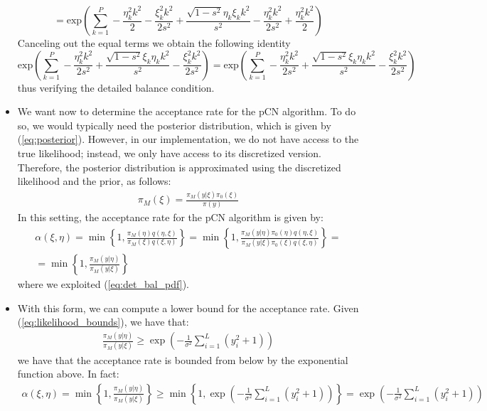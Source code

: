 \documentclass{article}
\begin{document}
\begin{itemize}
{$$    $$
    $$
    = \text{exp} \left( \sum_{k=1}^P - \frac{\eta_k^{2} k^2} {2} - \frac{ \xi^{2}_k k^2 } {2s^2} + \frac{\sqrt{1-s^2}\eta_k\xi_k k^2}{s^2} - \frac{ \eta^{2}_k k^2 } {2s^2} + \frac{ \eta^{2}_k k^2 } {2}\right)
    $$
    Canceling out the equal terms we obtain the following identity
    $$
    \text{exp} \left( \sum_{k=1}^P - \frac{ \eta^{2}_k k^2 } {2s^2} + \frac{\sqrt{1-s^2}\xi_k\eta_k k^2}{s^2} - \frac{ \xi^2_k k^2 } {2s^2} \right) =  \text{exp} \left( \sum_{k=1}^P - \frac{ \eta^{2}_k k^2 } {2s^2} + \frac{\sqrt{1-s^2}\xi_k\eta_k k^2}{s^2} - \frac{ \xi^2_k k^2 } {2s^2} \right) 
    $$
    thus verifying the detailed balance condition.}\\
\item{
    We want now to determine the acceptance rate for the pCN algorithm. To do so, we would typically 
    need the posterior distribution, which is given by (\ref{eq:posterior}). However, in our implementation, we do not have access to the true likelihood; 
    instead, we only have access to its discretized version. Therefore, the posterior distribution is 
    approximated using the discretized likelihood and the prior, as follows:
    \begin{gather*}
        \pi_M(\xi) = \frac{\pi_M(y|\xi)\pi_0(\xi)}{\pi(y)} 
    \end{gather*}
    In this setting, the acceptance rate for the pCN algorithm is given by:
    \begin{gather*}
        \alpha(\xi,\eta) = \min\left\{1, \frac{\pi_M(\eta)q(\eta,\xi)}{\pi_M(\xi)q(\xi,\eta)} \right\} =
        \min\left\{1, \frac{\pi_M(y|\eta)\pi_0(\eta)q(\eta,\xi)}{\pi_M(y|\xi)\pi_0(\xi)q(\xi,\eta)} \right\}=\\
        = \min\left\{1, \frac{\pi_M(y|\eta)}{\pi_M(y|\xi)} \right\}
    \end{gather*}
    where we exploited (\ref{eq:det_bal_pdf}).}\\
\item{
    With this form, we can compute a lower bound for the acceptance rate. Given (\ref{eq:likelihood_bounds}), we have that:
    \begin{gather*}
        \frac{\pi_M(y|\eta)}{\pi_M(y|\xi)} \geq \exp\left(-\frac{1}{\sigma^2}\sum_{i=1}^{L}{\left(y_i^2 + 1\right)}\right)
    \end{gather*}
    we have that the acceptance rate is bounded from below by the exponential function above. In fact:
    \begin{gather*}
        \alpha(\xi,\eta) = \min\left\{1, \frac{\pi_M(y|\eta)}{\pi_M(y|\xi)} \right\} \geq \min\left\{1, \exp\left(-\frac{1}{\sigma^2}\sum_{i=1}^{L}{\left(y_i^2 + 1\right)}\right) \right\}=
        \exp\left(-\frac{1}{\sigma^2}\sum_{i=1}^{L}{\left(y_i^2 + 1\right)}\right)
    \end{gather*}}
\end{itemize}
\end{document}
